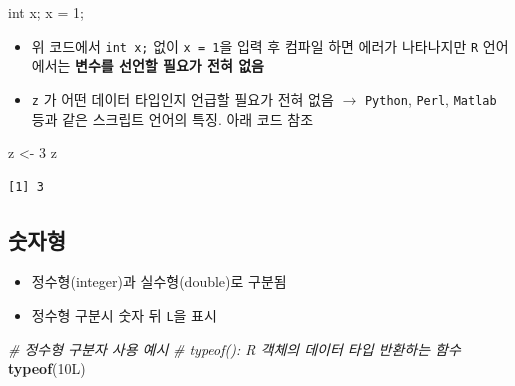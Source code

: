 \documentclass[
  11pt,
]{krantz}
\newenvironment{Shaded}{\begin{snugshade}}{\end{snugshade}}
\newcommand{\CommentTok}[1]{\textcolor[rgb]{0.37,0.37,0.37}{\textit{#1}}}
\newcommand{\DataTypeTok}[1]{\textcolor[rgb]{0.27,0.27,0.27}{#1}}
\newcommand{\DecValTok}[1]{\textcolor[rgb]{0.06,0.06,0.06}{#1}}
\newcommand{\KeywordTok}[1]{\textcolor[rgb]{0.27,0.27,0.27}{\textbf{#1}}}
\newcommand{\NormalTok}[1]{#1}
\newcommand{\StringTok}[1]{\textcolor[rgb]{0.5,0.5,0.5}{#1}}
\providecommand{\tightlist}{%
  \setlength{\itemsep}{0pt}\setlength{\parskip}{0pt}}
\begin{document}
\footnotesize

\begin{Shaded}
\begin{Highlighting}[]
\DataTypeTok{int}\NormalTok{ x; }
\NormalTok{x = }\DecValTok{1}\NormalTok{;}
\end{Highlighting}
\end{Shaded}

\normalsize

\begin{itemize}
\item
  위 코드에서 \texttt{int\ x;} 없이 \texttt{x\ =\ 1}을 입력 후 컴파일 하면 에러가 나타나지만 \texttt{R} 언어에서는 \textbf{변수를 선언할 필요가 전혀 없음}
\item
  \texttt{z} 가 어떤 데이터 타입인지 언급할 필요가 전혀 없음 \(\rightarrow\) \texttt{Python}, \texttt{Perl}, \texttt{Matlab} 등과 같은 스크립트 언어의 특징. 아래 코드 참조
\end{itemize}

\footnotesize

\begin{Shaded}
\begin{Highlighting}[]
\NormalTok{z <-}\StringTok{ }\DecValTok{3}
\NormalTok{z}
\end{Highlighting}
\end{Shaded}

\begin{verbatim}
[1] 3
\end{verbatim}

\normalsize

\hypertarget{numeric}{%
\subsection{숫자형}\label{numeric}}

\begin{itemize}
\tightlist
\item
  정수형(integer)과 실수형(double)로 구분됨
\item
  정수형 구분시 숫자 뒤 \texttt{L}을 표시
\end{itemize}

\footnotesize

\begin{Shaded}
\begin{Highlighting}[]
\CommentTok{# 정수형 구분자 사용 예시}
\CommentTok{# typeof(): R 객체의 데이터 타입 반환하는 함수}
\KeywordTok{typeof}\NormalTok{(10L)}
\end{Highlighting}
\end{Shaded}
\end{document}
